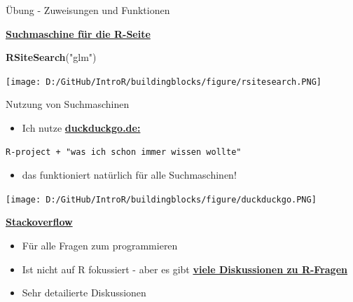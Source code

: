 \documentclass[ignorenonframetext,]{beamer}
\newenvironment{Shaded}{\begin{snugshade}}{\end{snugshade}}
\newcommand{\KeywordTok}[1]{\textcolor[rgb]{0.26,0.66,0.93}{\textbf{#1}}}
\newcommand{\NormalTok}[1]{\textcolor[rgb]{0.74,0.68,0.62}{#1}}
\newcommand{\StringTok}[1]{\textcolor[rgb]{0.02,0.61,0.04}{#1}}
\providecommand{\tightlist}{%
  \setlength{\itemsep}{0pt}\setlength{\parskip}{0pt}}
\begin{document}
\begin{frame}[fragile]{Übung - Zuweisungen und Funktionen}
\begin{frame}[fragile]{\href{http://search.r-project.org/cgi-bin/namazu.cgi?query=glm\&max=20\&result=normal\&sort=score\&idxname=functions\&idxname=vignettes\&idxname=views}{\textbf{Suchmaschine
für die R-Seite}}}
\protect\hypertarget{suchmaschine-fur-die-r-seite}{}

\begin{Shaded}
\begin{Highlighting}[]
\KeywordTok{RSiteSearch}\NormalTok{(}\StringTok{"glm"}\NormalTok{)}
\end{Highlighting}
\end{Shaded}

\texttt{[image: D:/GitHub/IntroR/buildingblocks/figure/rsitesearch.PNG]}

\end{frame}

\begin{frame}[fragile]{Nutzung von Suchmaschinen}
\protect\hypertarget{nutzung-von-suchmaschinen}{}

\begin{itemize}
\tightlist
\item
  Ich nutze \href{}{\textbf{duckduckgo.de:}}
\end{itemize}

\begin{verbatim}
R-project + "was ich schon immer wissen wollte" 
\end{verbatim}

\begin{itemize}
\tightlist
\item
  das funktioniert natürlich für alle Suchmaschinen!
\end{itemize}

\texttt{[image: D:/GitHub/IntroR/buildingblocks/figure/duckduckgo.PNG]}

\end{frame}

\begin{frame}{\href{http://stackoverflow.com/}{\textbf{Stackoverflow}}}
\protect\hypertarget{stackoverflow}{}

\begin{itemize}
\tightlist
\item
  Für alle Fragen zum programmieren
\item
  Ist nicht auf R fokussiert - aber es gibt
  \href{https://stackoverflow.com/tags/r/info}{\textbf{viele
  Diskussionen zu R-Fragen}}
\item
  Sehr detailierte Diskussionen
\end{itemize}


\end{frame}
\end{frame}
\end{document}
